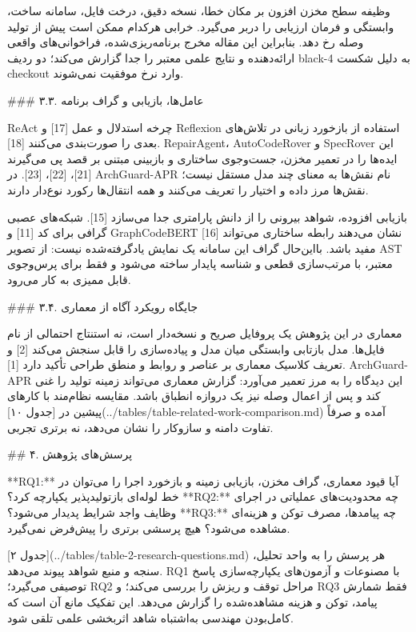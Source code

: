 \documentclass[11pt,a4paper]{article}
\begin{document}
وظیفه سطح مخزن افزون بر مکان خطا، نسخه دقیق، درخت فایل، سامانه ساخت، وابستگی و فرمان ارزیابی را دربر
می‌گیرد. خرابی هرکدام ممکن است پیش از تولید وصله رخ دهد. بنابراین این مقاله مخرج برنامه‌ریزی‌شده،
فراخوانی‌های واقعی ارائه‌دهنده و نتایج علمی معتبر را جدا گزارش می‌کند؛ دو ردیف black-4 به دلیل شکست
checkout وارد نرخ موفقیت نمی‌شوند.

\#\#\# ۳.۳. عامل‌ها، بازیابی و گراف برنامه

ReAct چرخه استدلال و عمل [17] و Reflexion استفاده از بازخورد زبانی در تلاش‌های بعدی را صورت‌بندی
می‌کنند [18]. RepairAgent، AutoCodeRover و SpecRover این ایده‌ها را در تعمیر مخزن، جست‌وجوی ساختاری
و بازبینی مبتنی بر قصد پی می‌گیرند [21]، [22]، [23]. در ArchGuard-APR نام نقش‌ها به معنای چند مدل
مستقل نیست؛ نقش‌ها مرز داده و اختیار را تعریف می‌کنند و همه انتقال‌ها رکورد نوع‌دار دارند.

بازیابی افزوده، شواهد بیرونی را از دانش پارامتری جدا می‌سازد [15]. شبکه‌های عصبی گرافی برای کد [11]
و GraphCodeBERT [16] نشان می‌دهند رابطه ساختاری می‌تواند مفید باشد. بااین‌حال گراف این سامانه یک نمایش
یادگرفته‌شده نیست: از تصویر AST معتبر، با مرتب‌سازی قطعی و شناسه پایدار ساخته می‌شود و فقط برای
پرس‌وجوی قابل ممیزی به کار می‌رود.

\#\#\# ۳.۴. جایگاه رویکرد آگاه از معماری

معماری در این پژوهش یک پروفایل صریح و نسخه‌دار است، نه استنتاج احتمالی از نام فایل‌ها. مدل بازتابی
وابستگی میان مدل و پیاده‌سازی را قابل سنجش می‌کند [2] و تعریف کلاسیک معماری بر عناصر و روابط و منطق
طراحی تأکید دارد [1]. ArchGuard-APR این دیدگاه را به مرز تعمیر می‌آورد: گزارش معماری می‌تواند زمینه
تولید را غنی کند و پس از اعمال وصله نیز یک دروازه انطباق باشد. مقایسه نظام‌مند با کارهای پیشین در
[جدول ۱۰](../tables/table-related-work-comparison.md) آمده و صرفاً تفاوت دامنه و سازوکار را نشان می‌دهد،
نه برتری تجربی.

\#\# ۴. پرسش‌های پژوهش

**RQ1:** آیا قیود معماری، گراف مخزن، بازیابی زمینه و بازخورد اجرا را می‌توان در خط لوله‌ای بازتولیدپذیر
یکپارچه کرد؟ **RQ2:** چه محدودیت‌های عملیاتی در اجرای وظایف واجد شرایط پدیدار می‌شود؟ **RQ3:** چه
پیامدها، مصرف توکن و هزینه‌ای مشاهده می‌شود؟ هیچ پرسشی برتری را پیش‌فرض نمی‌گیرد.

[جدول ۲](../tables/table-2-research-questions.md) هر پرسش را به واحد تحلیل، سنجه و منبع شواهد پیوند
می‌دهد. RQ1 با مصنوعات و آزمون‌های یکپارچه‌سازی پاسخ توصیفی می‌گیرد؛ RQ2 مراحل توقف و ریزش را بررسی
می‌کند؛ و RQ3 فقط شمارش پیامد، توکن و هزینه مشاهده‌شده را گزارش می‌دهد. این تفکیک مانع آن است که
کامل‌بودن مهندسی به‌اشتباه شاهد اثربخشی علمی تلقی شود.
\end{document}
